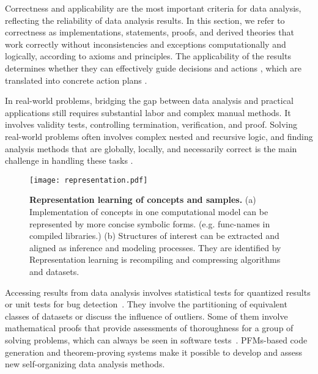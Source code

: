   Correctness and applicability are the most important criteria for data analysis, reflecting the reliability of data analysis results. In this section, we refer to correctness as implementations, statements, proofs, and derived theories that work correctly without inconsistencies and exceptions computationally and logically, according to axioms and principles. The applicability of the results determines whether they can effectively guide decisions and actions \cite{027davenport2017competing}, which are translated into concrete action plans \cite{040shmueli2011predictive}.
  
  In real-world problems, bridging the gap between data analysis and practical applications still requires substantial labor and complex manual methods. It involves validity tests, controlling termination, verification, and proof. Solving real-world problems often involves complex nested and recursive logic, and finding analysis methods that are globally, locally, and necessarily correct \cite{shao2023synthetic} is the main challenge in handling these tasks \cite{yao2024tree}. 
  
  
  \begin{figure*}[h]
    \centering
    \texttt{[image: representation.pdf]} %
    \caption{\textbf{Representation learning of concepts and samples.} (a) Implementation of concepts in one computational model can be represented by more concise symbolic forms. (e.g. func-names in compiled libraries.) (b) Structures of interest can be extracted and aligned as inference and modeling processes. They are identified by  Representation learning is recompiling and compressing algorithms and datasets.}
    \label{fig:representation_learning}
  \end{figure*}
  
  Accessing results from data analysis involves statistical tests for quantized results or unit tests for bug detection~\cite{schafer2023empirical,alshahwan2024automated}. They involve the partitioning of equivalent classes of datasets or discuss the influence of outliers. Some of them involve mathematical proofs that provide assessments of thoroughness for a group of solving problems, which can always be seen in software tests~\cite{schumann2013automated}. PFMs-based code generation and theorem-proving systems \cite{Pei2023CanLL,Wang2024TheoremLlamaTG, Rodriguez2024ExploringAO} make it possible to develop and assess new self-organizing data analysis methods. 
  
